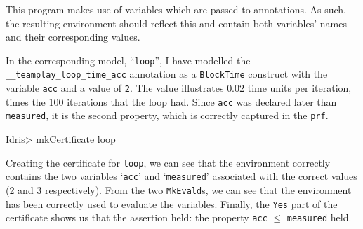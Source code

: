         This program makes use of variables which are passed to annotations. As such, the resulting environment should reflect this and contain both variables' names and their corresponding values.
        
        \newpage
        
        
        In the corresponding \Idris model, ``\texttt{loop}'', I have modelled the \texttt{\_\_teamplay\_loop\_time\_acc} annotation as a \texttt{BlockTime} construct with the variable \texttt{acc} and a value of \texttt{2}. The value illustrates $0.02$ time units per iteration, times the 100 iterations that the loop had. Since \texttt{acc} was declared later than \texttt{measured}, it is the second property, which is correctly captured in the \texttt{prf}.
        
        \begin{code}
Idris> mkCertificate loop
        \end{code}
        
        Creating the certificate for \texttt{loop}, we can see that the environment correctly contains the two variables `\texttt{acc}' and `\texttt{measured}' associated with the correct values (2 and 3 respectively). From the two \texttt{MkEvald}s, we can see that the environment has been correctly used to evaluate the variables. Finally, the \texttt{Yes} part of the certificate shows us that the assertion held: the property \texttt{acc} $\leq$ \texttt{measured} held.
